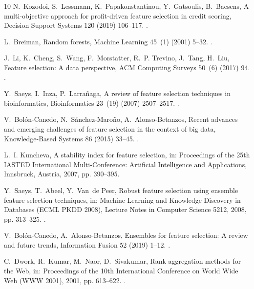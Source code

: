 \documentclass[preprint,12pt]{elsarticle}
\begin{document}
\begin{thebibliography}{10}
N.~Kozodoi, S.~Lessmann, K.~Papakonstantinou, Y.~Gatsoulis, B.~Baesens, A
  multi-objective approach for profit-driven feature selection in credit
  scoring, Decision Support Systems 120 (2019) 106--117.
\newblock \href {https://doi.org/10.1016/j.dss.2019.03.011}
  {}.

L.~Breiman, Random forests, Machine Learning 45~(1) (2001) 5--32.
\newblock \href {https://doi.org/10.1023/A:1010933404324}
  {}.

J.~Li, K.~Cheng, S.~Wang, F.~Morstatter, R.~P. Trevino, J.~Tang, H.~Liu,
  Feature selection: A data perspective, ACM Computing Surveys 50~(6) (2017)
  94.
\newblock \href {https://doi.org/10.1145/3136625} {}.

Y.~Saeys, I.~Inza, P.~Larra{\~n}aga, A review of feature selection techniques
  in bioinformatics, Bioinformatics 23~(19) (2007) 2507--2517.
\newblock \href {https://doi.org/10.1093/bioinformatics/btm344}
  {}.

V.~Bol{\'o}n-Canedo, N.~S{\'a}nchez-Maro{\~n}o, A.~Alonso-Betanzos, Recent
  advances and emerging challenges of feature selection in the context of big
  data, Knowledge-Based Systems 86 (2015) 33--45.
\newblock \href {https://doi.org/10.1016/j.knosys.2015.05.014}
  {}.

L.~I. Kuncheva, A stability index for feature selection, in: Proceedings of the
  25th IASTED International Multi-Conference: Artificial Intelligence and
  Applications, Innsbruck, Austria, 2007, pp. 390--395.

Y.~Saeys, T.~Abeel, Y.~Van~de Peer, Robust feature selection using ensemble
  feature selection techniques, in: Machine Learning and Knowledge Discovery in
  Databases (ECML PKDD 2008), Lecture Notes in Computer Science 5212, 2008, pp.
  313--325.
\newblock \href {https://doi.org/10.1007/978-3-540-87481-2_21}
  {}.

V.~Bol{\'o}n-Canedo, A.~Alonso-Betanzos, Ensembles for feature selection: A
  review and future trends, Information Fusion 52 (2019) 1--12.
\newblock \href {https://doi.org/10.1016/j.inffus.2018.11.008}
  {}.

C.~Dwork, R.~Kumar, M.~Naor, D.~Sivakumar, Rank aggregation methods for the
  {W}eb, in: Proceedings of the 10th International Conference on World Wide Web
  (WWW 2001), 2001, pp. 613--622.
\newblock \href {https://doi.org/10.1145/371920.372165}
  {}.


\end{thebibliography}
\end{document}
